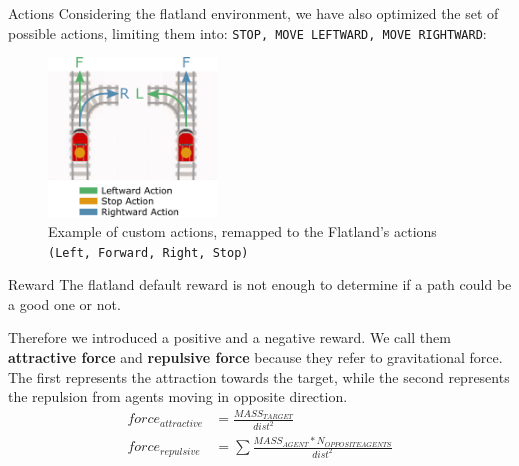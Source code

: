 \documentclass[10pt, xcolor={dvipsnames}]{beamer}
\begin{document}
\begin{frame}{Actions}
    Considering the flatland environment, we have also optimized the set of possible actions, limiting them into: \texttt{STOP, MOVE LEFTWARD, MOVE RIGHTWARD}:
    \begin{figure}
        \centering
        \includegraphics[width=0.4\textwidth]{assets/environment/actions.png}
        \caption*{Example of \alert{custom actions}, remapped to the Flatland's actions \texttt{(Left, Forward, Right, Stop)}}
    \end{figure}
\end{frame}

\begin{frame}{Reward}
    The flatland default reward is not enough to determine if a path could be a good one or not.
    
    Therefore we introduced a positive and a negative reward. We call them \textbf{attractive force} and \textbf{repulsive force} because they refer to gravitational force. The first represents the attraction towards the target, while the second represents the repulsion from agents moving in opposite direction.
    \begin{align*}
        force_{attractive} &= \frac{MASS_{TARGET}}{dist^2} \\
        force_{repulsive} &= \sum \frac{MASS_{AGENT} * N_{OPPOSITE AGENTS}}{dist^2}
    \end{align*}
\end{frame}


\end{document}
